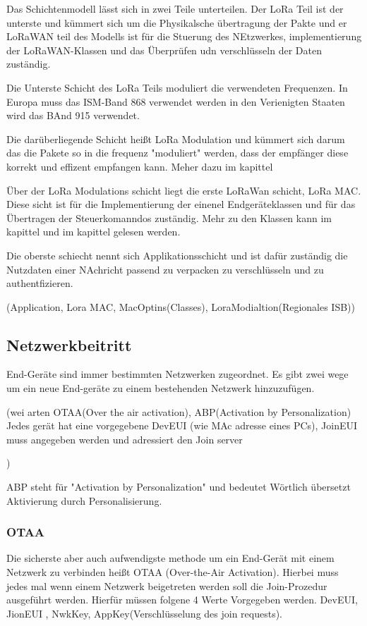 \documentclass[a4paper,12pt]{article}
\begin{document}
            Das Schichtenmodell lässt sich in zwei Teile unterteilen. Der LoRa Teil ist der unterste und kümmert sich um die Physikalsche übertragung der Pakte und er LoRaWAN teil des Modells ist für die Stuerung des NEtzwerkes, implementierung der LoRaWAN-Klassen und das Überprüfen udn verschlüsseln der Daten zuständig.

            Die Unterste Schicht des LoRa Teils moduliert die verwendeten Frequenzen. In Europa muss das ISM-Band 868 verwendet werden in den Verienigten Staaten wird das BAnd 915 verwendet.

            Die darüberliegende Schicht heißt LoRa Modulation und kümmert sich darum das die Pakete so in die frequenz "moduliert" werden, dass der empfänger diese korrekt und effizent empfangen kann. Meher dazu im kapittel 

            Über der LoRa Modulations schicht liegt die erste LoRaWan schicht, LoRa MAC. Diese sicht ist für die Implementierung der einenel Endgeräteklassen und für das Übertragen der Steuerkomanndos zuständig. Mehr zu den Klassen kann im kapittel  und im kapittel  gelesen werden.

            Die oberste schiecht nennt sich Applikationsschicht und ist dafür zuständig die Nutzdaten einer NAchricht passend zu verpacken zu verschlüsseln und zu authentfizieren.

            \cite{WhatIsLoRa}(Application, Lora MAC, MacOptins(Classes), LoraModialtion(Regionales ISB))
        \subsection{Netzwerkbeitritt}
            End-Geräte sind immer bestimmten Netzwerken zugeordnet. Es gibt zwei wege um ein neue End-geräte zu einem bestehenden Netzwerk hinzuzufügen.

            \cite{LoRaSpec}(wei arten OTAA(Over the air activation), ABP(Activation by Personalization)
                    Jedes gerät hat eine vorgegebene DevEUI (wie MAc adresse eines PCs), JoinEUI muss angegeben werden und adressiert den Join server 
                    
            )
            
            
                ABP steht für "Activation by Personalization" und bedeutet Wörtlich übersetzt Aktivierung durch Personalisierung. 

            
            \subsubsection{OTAA} \label{sec:OTAA}
            Die sicherste aber auch aufwendigste methode um ein End-Gerät mit einem Netzwerk zu verbinden heißt OTAA (Over-the-Air Activation). Hierbei muss jedes mal wenn einem Netzwerk beigetreten werden soll die Join-Prozedur ausgeführt werden.
            Hierfür müssen folgene 4 Werte Vorgegeben werden. DevEUI, JionEUI , NwkKey, AppKey(Verschlüsselung des join requests).
\end{document}
